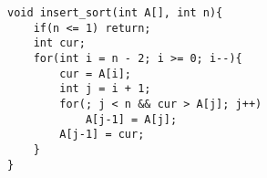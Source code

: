     
\begin{lstlisting}
void insert_sort(int A[], int n){
	if(n <= 1) return;
	int cur;
	for(int i = n - 2; i >= 0; i--){
		cur = A[i];
		int j = i + 1;
		for(; j < n && cur > A[j]; j++)
			A[j-1] = A[j];
		A[j-1] = cur;
	}
}
\end{lstlisting}
